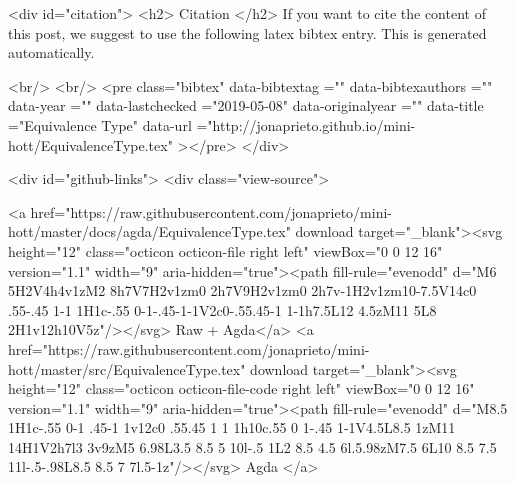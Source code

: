   
  <div id="citation">
  <h2> Citation </h2>
  If you want to cite the content of this post,
  we suggest to use the following latex bibtex entry.
  This is generated automatically.

  <br/>
  <br/>
  <pre class="bibtex"
       data-bibtextag =""
       data-bibtexauthors =""
       data-year =""
       data-lastchecked ="2019-05-08"
       data-originalyear =""
       data-title ="Equivalence Type"
       data-url ="http://jonaprieto.github.io/mini-hott/EquivalenceType.tex"
  ></pre>
  </div>
  

  <div id="github-links">
    <div class="view-source">
      
        <a href="https://raw.githubusercontent.com/jonaprieto/mini-hott/master/docs/agda/EquivalenceType.tex" download target="_blank"><svg height="12" class="octicon octicon-file right left" viewBox="0 0 12 16" version="1.1" width="9" aria-hidden="true"><path fill-rule="evenodd" d="M6 5H2V4h4v1zM2 8h7V7H2v1zm0 2h7V9H2v1zm0 2h7v-1H2v1zm10-7.5V14c0 .55-.45 1-1 1H1c-.55 0-1-.45-1-1V2c0-.55.45-1 1-1h7.5L12 4.5zM11 5L8 2H1v12h10V5z"/></svg> Raw + Agda</a>
        <a href="https://raw.githubusercontent.com/jonaprieto/mini-hott/master/src/EquivalenceType.tex" download target="_blank"><svg height="12" class="octicon octicon-file-code right left" viewBox="0 0 12 16" version="1.1" width="9" aria-hidden="true"><path fill-rule="evenodd" d="M8.5 1H1c-.55 0-1 .45-1 1v12c0 .55.45 1 1 1h10c.55 0 1-.45 1-1V4.5L8.5 1zM11 14H1V2h7l3 3v9zM5 6.98L3.5 8.5 5 10l-.5 1L2 8.5 4.5 6l.5.98zM7.5 6L10 8.5 7.5 11l-.5-.98L8.5 8.5 7 7l.5-1z"/></svg> Agda </a>
      

